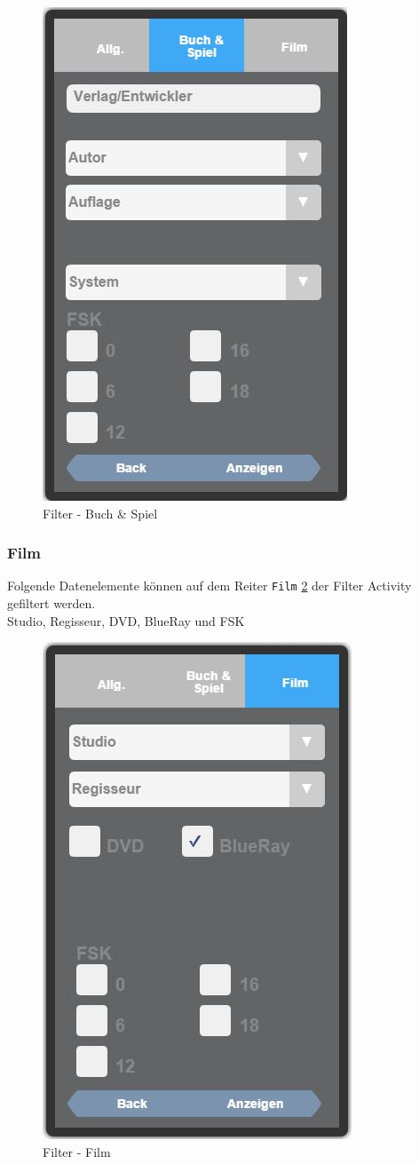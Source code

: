 \begin{figure}[htbp]
	\centering
	\includegraphics[scale=0.5]{pic/GUI/FilterBS}
	\caption{Filter - Buch \& Spiel}
	\label{fig:BS}
\end{figure}

\subsubsection{Film}

Folgende Datenelemente können auf dem Reiter {\color{IndianRed}\texttt{Film}} \ref{fig:Film} der Filter Activity gefiltert werden.\\

Studio, Regisseur, DVD, BlueRay und FSK

\begin{figure}[htbp]
	\centering
	\includegraphics[scale=0.5]{pic/GUI/FilterFilm}
	\caption{Filter - Film}
	\label{fig:Film}
\end{figure}